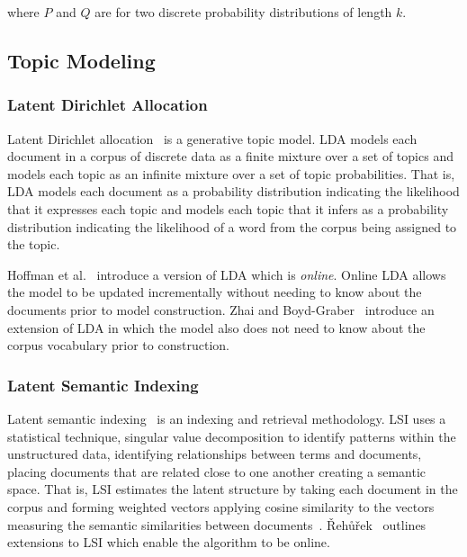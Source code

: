 where $P$ and $Q$ are for two discrete probability distributions of length $k$.

\subsection{Topic Modeling}

\subsubsection{Latent Dirichlet Allocation}

Latent Dirichlet allocation~\cite{Blei-etal:2003} is a generative topic model.
LDA models each document in a corpus of discrete data as a finite mixture over
a set of topics and models each topic as an infinite mixture over a set of
topic probabilities.  That is, LDA models each document as a probability
distribution indicating the likelihood that it expresses each topic and models
each topic that it infers as a probability distribution indicating the
likelihood of a word from the corpus being assigned to the topic.

Hoffman et al.~\cite{Hoffman-etal:2010} introduce a version of LDA which is
\emph{online}.
Online LDA allows the model to be updated incrementally without needing
to know about the documents prior to model construction.
Zhai and Boyd-Graber~\cite{Zhai-Boyd-Graber:2013} introduce an extension of LDA
in which the model also does not need to know about the corpus vocabulary prior to construction.

\subsubsection{Latent Semantic Indexing}

Latent semantic indexing~\cite{Deerwester-etal:1990} is an indexing and
retrieval methodology. LSI uses a statistical technique, singular value
decomposition to identify patterns within the unstructured data, identifying
relationships between terms and documents, placing documents that are related
close to one another creating a semantic space. That is, LSI estimates the
latent structure by taking each document in the corpus and forming weighted
vectors applying cosine similarity to the vectors measuring the semantic
similarities between documents~\cite{Binkley-Lawrie:2010}.
{\v R}eh{\r u}{\v r}ek~\cite{Radim:2011} outlines extensions to LSI
which enable the algorithm to be online.


